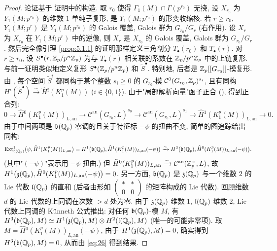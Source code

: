 \begin{proof}
论证基于 \cite[Th.~2.1.5]{ref:24} 证明中的构造.
取 $r_0$ 使得 $\Gamma_1(M) \cap \Gamma(p^{r_0})$ 无挠, 设 $X_{r_0}$ 为 $Y_1(M;p^{r_0})$ 的维数 $1$ 单纯子复形, 是 $Y_1(M;p^{r_0})$ 的形变收缩核.
若 $r \ge r_0$, $Y_1(M;p^{r})$ 是 $Y_1(M;p^{r_0})$ 的 Galois 覆盖, Galois 群为 $G_{r_0}/G_r$ (右作用).
设 $X_r$ 为 $X_{r_0}$ 在 $Y_1(M;p^{r})$ 中的逆像, 则 $X_r$ 是 $X_{r_0}$ 的 Galois 覆盖, Galois 群为 $G_{r_0}/G_r$.
然后完全像引理 \ref{prop:5.1.1} 的证明那样定义三角剖分 $T_{\bullet}(r_0)$ 和 $T_{\bullet}(r)$.
对 $r \ge r_0$, 设 $S^{\bullet}(r,\mathbb{Z}_p/p^{n}\mathbb{Z}_p)$ 为与 $T_{\bullet}(r)$ 相关联的系数在 $\mathbb{Z}_p/p^{n}\mathbb{Z}_p$ 中的上链复形.
与前一证明类似地定义复形 $S^{\bullet}(\mathbb{Z}_p/p^{n}\mathbb{Z}_p)$ 和 $\widetilde{S}^{\bullet}$.
特别地, 后者是 $\mathbb{Z}_p[[G_{r_0}]]$-模复形.
由 \cite[Th.~2.1.5]{ref:24}, 每个空间 $\widetilde{S}^{i}$ 都同构于某个整数 $s_i \ge 0$ 的 $G_{r_0}$-模 $\mathcal{C}^{0}(G_{r_0},\mathbb{Z}_p)^{s_i}$, 且有同构 $H^{i}(\widetilde{S}^{\bullet}) \xrightarrow{\sim} \widehat{H}{}^{i}(K_1^{p}(M))$ ($i \in \{0,1\}$).
由于"局部解析向量"函子正合 (\cite[Th.~7.1]{ref:45}), 得到正合列:
\[
0 \to \widehat{H}{}^{0}(K_1^{p}(M))_{L,\mathrm{an}} \to \mathcal{C}^{\mathrm{an}}(G_{r_0},L)^{s_0} \to \mathcal{C}^{\mathrm{an}}(G_{r_0},L)^{s_1} \to \widehat{H}{}^{1}(K_1^{p}(M))_{L,\mathrm{an}} \to 0.
\]
由于中间两项是 $\mathfrak{b}(\mathbb{Q}_p)$-零调的且关于特征标 $-\psi$ 的扭曲不变, 简单的图追踪给出同构:
\begin{equation}
\label{eq:26}
\operatorname{Ext}_{\mathfrak{b}(\mathbb{Q}_p)}^{1}\bigl(\psi,\widehat{H}{}^{1}(K_1^{p}(M))_{L,\mathrm{an}}\bigr)
= H^{1}\bigl(\mathfrak{b}(\mathbb{Q}_p),\widehat{H}{}^{1}(K_1^{p}(M))_{L,\mathrm{an}}(-\psi)\bigr)
\xrightarrow{\sim} H^{3}\bigl(\mathfrak{b}(\mathbb{Q}_p),\widehat{H}{}^{0}(K_1^{p}(M))_{L,\mathrm{an}}(-\psi)\bigr).
\end{equation}
(其中"$(-\psi)$"表示用 $-\psi$ 扭曲.)
但 $\widehat{H}{}^{0}(K_1^{p}(M))_{L,\mathrm{an}} \xrightarrow{\sim} \mathcal{C}^{\mathrm{an}}(\mathbb{Z}_p^{\times},L)$, 故 $H^{1}\bigl(\mathfrak{z}(\mathbb{Q}_p),\widehat{H}{}^{0}(K_1^{p}(M))_{L,\mathrm{an}}(-\psi)\bigr) = 0$.
另一方面, $\mathfrak{b}(\mathbb{Q}_p)$ 是 $\mathfrak{z}(\mathbb{Q}_p)$ 与一个维数 $2$ 的 Lie 代数 $\mathfrak{l}(\mathbb{Q}_p)$ 的直和 (后者由形如 $\begin{pmatrix} * & * \\ 0 & 0 \end{pmatrix}$ 的矩阵构成的 Lie 代数).
回顾维数 $d$ 的 Lie 代数的上同调在次数 $> d$ 处为零.
由于 $\mathfrak{z}(\mathbb{Q}_p)$ 维数 $1$, $\mathfrak{l}(\mathbb{Q}_p)$ 维数 $2$, Lie 代数上同调的 K\"unneth 公式推出: 对任何 $\mathfrak{b}(\mathbb{Q}_p)$-模 $M$, 有 $H^{3}(\mathfrak{b}(\mathbb{Q}_p),M) \simeq H^{1}(\mathfrak{z}(\mathbb{Q}_p),M) \otimes H^{2}(\mathfrak{l}(\mathbb{Q}_p),M)$ (唯一的可能非零项).
取 $M = \widehat{H}{}^{0}(K_1^{p}(M))_{L,\mathrm{an}}(-\psi)$, 由于 $H^{1}(\mathfrak{z}(\mathbb{Q}_p),M) = 0$, 确实得到 $H^{3}(\mathfrak{b}(\mathbb{Q}_p),M) = 0$, 从而由 \eqref{eq:26} 得到结果.
\end{proof}

